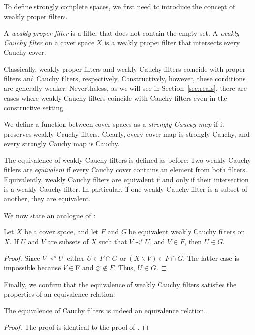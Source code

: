 \documentclass[reqno]{amsart}
\theoremstyle{definition}
\theoremstyle{remark}
\numberwithin{figure}{section}
\newcommand{\rb}{\prec}
\begin{document}
To define strongly complete spaces, we first need to introduce the concept of weakly proper filters.

\begin{defn}
A \emph{weakly proper filter} is a filter that does not contain the empty set.
A \emph{weakly Cauchy filter} on a cover space $X$ is a weakly proper filter that intersects every Cauchy cover.
\end{defn}

\begin{remark}
Classically, weakly proper filters and weakly Cauchy filters coincide with proper filters and Cauchy filters, respectively.
Constructively, however, these conditions are generally weaker.
Nevertheless, as we will see in Section~\ref{sec:reals}, there are cases where weakly Cauchy filters coincide with Cauchy filters even in the constructive setting.
\end{remark}

We define a function between cover spaces as a \emph{strongly Cauchy map} if it preserves weakly Cauchy filters.
Clearly, every cover map is strongly Cauchy, and every strongly Cauchy map is Cauchy.

The equivalence of weakly Cauchy filters is defined as before:
Two weakly Cauchy fitlers are \emph{equivalent} if every Cauchy cover contains an element from both filters.
Equivalently, weakly Cauchy filters are equivalent if and only if their intersection is a weakly Cauchy filter.
In particular, if one weakly Cauchy filter is a subset of another, they are equivalent.

We now state an analogue of :

\begin{lem}
Let $X$ be a cover space, and let $F$ and $G$ be equivalent weakly Cauchy filters on $X$.
If $U$ and $V$ are subsets of $X$ such that $V \rb^s U$, and $V \in F$, then $U \in G$.
\end{lem}
\begin{proof}
Since $V \rb^s U$, either $U \in F \cap G$ or $(X \backslash V) \in F \cap G$.
The latter case is impossible because $V \in $F and $\varnothing \notin F$.
Thus, $U \in G$.
\end{proof}

Finally, we confirm that the equivalence of weakly Cauchy filters satisfies the properties of an equivalence relation:

\begin{prop}
The equivalence of Cauchy filters is indeed an equivalence relation.
\end{prop}
\begin{proof}
The proof is identical to the proof of .
\end{proof}
\end{document}
